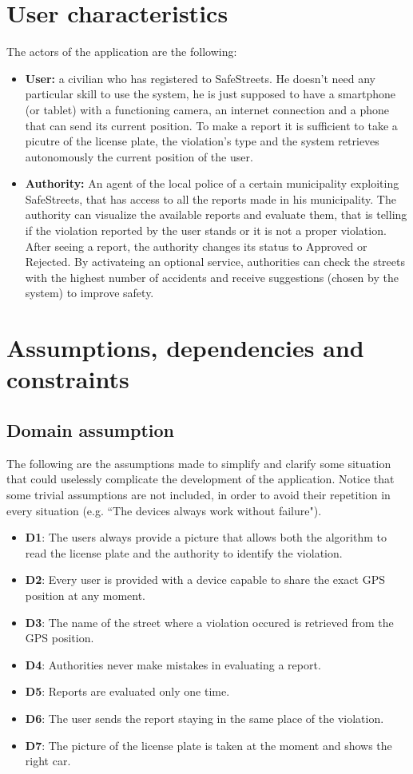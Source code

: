 \documentclass[12pt,a4paper]{report}
\begin{document}
	\section{User characteristics}
		The actors of the application are the following:
		\begin{itemize}
			\item \textbf{User:}
				a civilian who has registered to SafeStreets. He doesn't need any particular skill to use the system, 
				he is just supposed to have a smartphone (or tablet) with a functioning camera, an internet connection and
				a phone that can send its current position.  To make a report it is sufficient to
				take a picutre of the license plate, the violation's type and the system retrieves autonomously the current position
				of the user.
			\item \textbf{Authority:}
				An agent of the local police of a certain municipality exploiting SafeStreets, that has access to all the reports made
				 in his municipality. The authority can visualize the available reports and evaluate them, that is telling if the
				violation reported by the user stands or it is not a proper violation. After seeing a report, the authority 
				changes its status to Approved or Rejected. By activateing
				an optional service, authorities can check the streets with the highest number of accidents and receive
				suggestions (chosen by the system) to improve safety.
		\end{itemize}
	\section{Assumptions, dependencies and constraints}
	\subsection{Domain assumption} 
The following are the assumptions made to simplify and clarify some situation that could uselessly complicate the development of the application. Notice that some trivial assumptions are not included, in order to avoid their repetition in every situation (e.g. ``The devices always work without failure").
		\begin{itemize}
			\item \textbf{D1}: The users always provide a picture that allows both the algorithm to read the license plate and
					        the authority to identify the violation.
			\item \textbf{D2}: Every user is provided with a device capable to share the exact GPS position at any moment.
			\item \textbf{D3}: The name of the street where a violation occured is retrieved from the GPS position.
			\item \textbf{D4}: Authorities never make mistakes in evaluating a report.
			\item \textbf{D5}: Reports are evaluated only one time.
			\item \textbf{D6}: The user sends the report staying in the same place of the violation.
			\item \textbf{D7}: The picture of the license plate is taken at the moment and shows the right car.
		\end{itemize}
\end{document}

